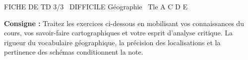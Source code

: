\documentclass[11pt]{article}
\begin{document}
\begin{tcolorbox}[enhanced,colback=popink,colframe=popink,arc=10pt,boxrule=0pt,left=12pt,right=12pt,top=9pt,bottom=9pt]
{\color{white}\popxbold\small FICHE DE TD 3/3 \textbullet\ DIFFICILE \hfill Géographie \textbullet\ Tle A C D E\par}
\end{tcolorbox}
\vspace{4pt}
\noindent\textbf{Consigne :} Traitez les exercices ci-dessous en mobilisant vos connaissances du cours, vos savoir-faire cartographiques et votre esprit d'analyse critique. La rigueur du vocabulaire géographique, la précision des localisations et la pertinence des schémas conditionnent la note.
\end{document}
